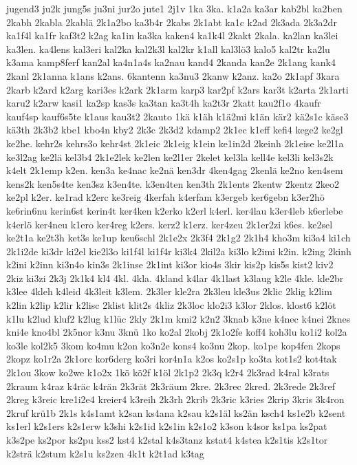 {jugend3
ju2k
jung5s
ju3ni
jur2o
jute1
2j1v
1ka
3ka.
k1a2a
ka3ar
kab2bl
ka2ben
2kabh
2kabla
2kablä
2k1a2bo
ka3b4r
2kabs
2k1abt
ka1c
k2ad
2k3ada
2k3a2dr
ka1f4l
ka1fr
kaf3t2
k2ag
ka1in
ka3ka
kaken4
ka1k4l
2kakt
2kala.
ka2lan
ka3lei
ka3len.
ka4lens
kal3eri
kal2ka
kal2k3l
kal2kr
k1all
kal3lö3
kalo5
kal2tr
ka2lu
k3ama
kamp8ferf
kan2al
ka4n1a4s
ka2nau
kand4
2kanda
kan2e
2k1ang
kank4
2kanl
2k1anna
k1ans
k2ans.
6kantenn
ka3nu3
2kanw
k2anz.
ka2o
2k1apf
3kara
2karb
k2ard
k2arg
kari3es
k2ark
2k1arm
karp3
kar2pf
k2ars
kar3t
k2arta
2k1arti
karu2
k2arw
kasi1
ka2sp
kas3s
ka3tan
ka3t4h
ka2t3r
2katt
kau2f1o
4kaufr
kauf4sp
kauf6s5te
k1aus
kau3t2
2kauto
1kä
k1äh
k1ä2mi
k1än
kär2
kä2s1c
käse3
kä3th
2k3b2
kbe1
kbo4n
kby2
2k3c
2k3d2
kdamp2
2k1ec
k1eff
kefi4
kege2
ke2gl
ke2he.
kehr2s
kehrs3o
kehr4st
2k1eic
2k1eig
k1ein
ke1in2d
2keinh
2k1eise
ke2l1a
ke3l2ag
ke2lä
kel3b4
2k1e2lek
ke2len
ke2l1er
2kelet
kel3la
kell4e
kel3li
kel3s2k
k4elt
2k1emp
k2en.
ken3a
ke4nac
ke2nä
ken3dr
4ken4gag
2kenlä
ke2no
ken4sem
kens2k
ken5s4te
ken3sz
k3en4te.
k3en4ten
ken3th
2k1ents
2kentw
2kentz
2keo2
ke2pl
k2er.
ke1rad
k2erc
ke3reig
4kerfah
k4erfam
k3ergeb
ker6gebn
k3er2hö
ke6rin6nu
kerin6st
kerin4t
ker4ken
k2erko
k2erl
k4erl.
ker4lau
k3er4leb
k6erlebe
k4erlö
ker4neu
k1ero
ker4reg
k2ers.
kerz2
k1erz.
ker4zeu
2k1er2zi
k6es.
ke2sel
ke2t1a
ke2t3h
ket3s
ke1up
keu6schl
2k1e2x
2k3f4
2k1g2
2k1h4
kho3m
ki3a4
ki1ch
2k1i2de
ki3dr
ki2el
kie2l3o
ki1f4l
ki1f4r
ki3k4
2kil2a
ki3lo
k2imi
k2in.
k2ing
2kinh
k2ini
k2inn
ki3n4o
kin3s
2k1inse
2k1int
ki3or
kio4s
3kir
kis2p
kis5s
kist2
kiv2
2kiz
ki3zi
2k3j
2k1k4
kl4
4kl.
4kla.
4kland
k4lar
4k1last
k3laug
k2le
4kle.
kle2br
k3lee
4kleh
k4leid
4k3leit
k3lem.
2k3ler
kle2ra
2k3leu
kle3us
2klic
2klig
k2lim
k2lin
k2lip
k2lir
k2lisc
2klist
klit2s
4kliz
2k3loc
klo2i3
k3lor
2klos.
klost6
k2löt
k1lu
k2lud
kluf2
k2lug
k1lüc
2kly
2k1m
kmi2
k2n2
3knab
k3ne
k4nec
k4nei
2knes
kni4e
kno4bl
2k5nor
k3nu
3knü
1ko
ko2al
2kobj
2k1o2fe
koff4
koh3lu
ko1i2
kol2a
ko3le
kol2k5
3kom
ko4mu
k2on
ko3n2e
kons4
ko3nu
2kop.
ko1pe
kop4fen
2kops
2kopz
ko1r2a
2k1orc
kor6derg
ko3ri
kor4n1a
k2os
ko2s1p
ko3ta
kot1s2
kot4tak
2k1ou
3kow
ko2we
k1o2x
1kö
kö2f
k1öl
2k1p2
2k3q
k2r4
2k3rad
k4ral
k3rats
2kraum
k4raz
k4räc
k4rän
2k3rät
2k3räum
2kre.
2k3rec
2kred.
2k3rede
2k3ref
2kreg
k3reic
kre1i2e4
kreier4
k3reih
2k3rh
2krib
2k3ric
k3ries
2krip
3kris
3k4ron
2kruf
krü1b
2k1s
k4s1amt
k2san
ks4ana
k2sau
k2s1äl
ks2än
ksch4
ks1e2b
k2sent
ks1erl
k2s1ers
k2s1erw
k3shi
k2s1id
k2s1in
k2s1o2
k3son
k4sor
ks1pa
ks2pat
k3s2pe
ks2por
ks2pu
kss2
kst4
k2stal
k4s3tanz
kstat4
k4stea
k2s1tis
k2s1tor
k2strä
k2stum
k2s1u
ks2zen
4k1t
k2t1ad
k3tag
}

